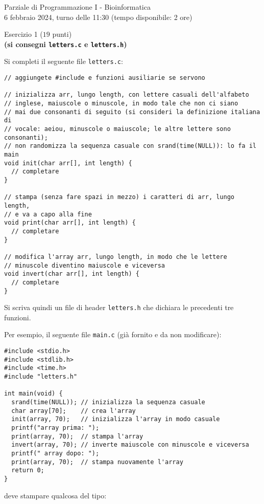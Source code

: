 \documentclass[12pt]{article}
\begin{document}
\begin{center}{\LARGE Parziale di Programmazione I - Bioinformatica}\\
  \large 6 febbraio 2024, turno delle 11:30 (tempo disponibile: 2 ore)
\end{center}

\vspace*{1ex}
\begin{center}{\Large Esercizio 1} ($19$ punti)\\
  \textbf{(si consegni \texttt{letters.c} e \texttt{letters.h})}
\end{center}

Si completi il seguente file \texttt{letters.c}:

\begin{center}
\begin{lstlisting}[language=myC]
// aggiungete #include e funzioni ausiliarie se servono

// inizializza arr, lungo length, con lettere casuali dell'alfabeto
// inglese, maiuscole o minuscole, in modo tale che non ci siano
// mai due consonanti di seguito (si consideri la definizione italiana di
// vocale: aeiou, minuscole o maiuscole; le altre lettere sono consonanti);
// non randomizza la sequenza casuale con srand(time(NULL)): lo fa il main
void init(char arr[], int length) {
  // completare
}

// stampa (senza fare spazi in mezzo) i caratteri di arr, lungo length,
// e va a capo alla fine
void print(char arr[], int length) {
  // completare
}

// modifica l'array arr, lungo length, in modo che le lettere
// minuscole diventino maiuscole e viceversa
void invert(char arr[], int length) {
  // completare
}
\end{lstlisting}
\end{center}
%
Si scriva quindi un file di header \texttt{letters.h} che dichiara le precedenti tre funzioni.

Per esempio, il seguente file \texttt{main.c}
(gi\`a fornito e da non modificare):

\begin{center}
  \begin{lstlisting}[language=myC]
#include <stdio.h>
#include <stdlib.h>
#include <time.h>
#include "letters.h"

int main(void) {
  srand(time(NULL)); // inizializza la sequenza casuale
  char array[70];    // crea l'array
  init(array, 70);   // inizializza l'array in modo casuale
  printf("array prima: ");
  print(array, 70);  // stampa l'array
  invert(array, 70); // inverte maiuscole con minuscole e viceversa
  printf(" array dopo: ");
  print(array, 70);  // stampa nuovamente l'array
  return 0;
}
  \end{lstlisting}
\end{center}
deve stampare qualcosa del tipo:
\end{document}
